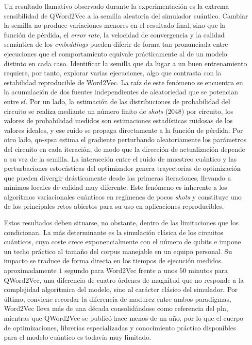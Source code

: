 Un resultado llamativo observado durante la experimentación es la extrema sensibilidad de QWord2Vec a la semilla aleatoria del simulador cuántico. Cambiar la semilla no produce variaciones menores en el resultado final, sino que la función de pérdida, el \textit{error rate}, la velocidad de convergencia y la calidad semántica de los \textit{embeddings} pueden diferir de forma tan pronunciada entre ejecuciones que el comportamiento equivale prácticamente al de un modelo distinto en cada caso. Identificar la semilla que da lugar a un buen entrenamiento requiere, por tanto, explorar varias ejecuciones, algo que contrasta con la estabilidad reproducible de Word2Vec. La raíz de este fenómeno se encuentra en la acumulación de dos fuentes independientes de aleatoriedad que se potencian entre sí. Por un lado, la estimación de las distribuciones de probabilidad del circuito se realiza mediante un número finito de \textit{shots} (2048) por circuito, los valores de probabilidad medidos son estimaciones estadísticas ruidosas de los valores ideales, y ese ruido se propaga directamente a la función de pérdida. Por otro lado, \gls{qn-spsa} estima el gradiente perturbando aleatoriamente los parámetros del circuito en cada iteración, de modo que la dirección de actualización depende a su vez de la semilla. La interacción entre el ruido de muestreo cuántico y las perturbaciones estocásticas del optimizador genera trayectorias de optimización que pueden divergir drásticamente desde las primeras iteraciones, llevando a mínimos locales de calidad muy diferente. Este fenómeno es inherente a los algoritmos variacionales cuánticos en regímenes de pocos \textit{shots} y constituye uno de los principales retos abiertos para su uso en aplicaciones reproducibles.

Estos resultados deben situarse, no obstante, dentro de las limitaciones que los condicionan. La más determinante es la simulación clásica de los circuitos cuánticos, cuyo coste crece exponencialmente con el número de qubits e impone un techo práctico al tamaño del corpus manejable en un equipo personal. Su impacto se traduce de forma directa en los tiempos de ejecución medidos. aproximadamente $1$ segundo para Word2Vec frente a unos $50$ minutos para QWord2Vec, una diferencia de cuatro órdenes de magnitud que no responde a la complejidad algorítmica del modelo, sino al carácter clásico del simulador. Por último, conviene recordar la diferencia de madurez entre ambos paradigmas, Word2Vec lleva más de una década consolidándose como referencia del \gls{pln}, mientras que QWord2Vec se publicó hace menos de un año, por lo que el cuerpo de optimizaciones, librerías especializadas y conocimiento práctico disponibles para el modelo cuántico es todavía muy limitado.


